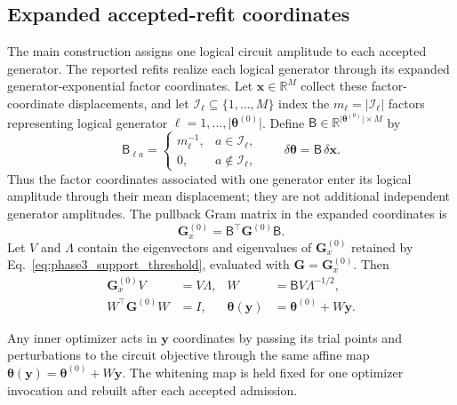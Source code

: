 \documentclass[
  reprint,
  amsmath,
  amssymb,
  aps,
  pra,
  nofootinbib,
  superscriptaddress,
  floatfix
]{revtex4-2}
\begin{document}
\subsection{Expanded accepted-refit coordinates}
\label{app:accepted_refit_details}

The main construction assigns one logical circuit amplitude to each accepted
generator. The reported refits realize each logical generator through its
expanded generator-exponential factor coordinates. Let
\(\mathbf x\in\mathbb R^M\) collect these factor-coordinate displacements, and
let \(\mathcal I_\ell\subseteq\{1,\ldots,M\}\) index the
\(m_\ell=|\mathcal I_\ell|\) factors representing logical generator
\(\ell=1,\ldots,\lvert\boldsymbol\theta^{(0)}\rvert\). Define
\(\mathsf B\in
\mathbb R^{\lvert\boldsymbol\theta^{(0)}\rvert\times M}\) by
\begin{equation}
\mathsf B_{\ell a}
=
\begin{cases}
m_\ell^{-1}, & a\in\mathcal I_\ell,\\
0, & a\notin\mathcal I_\ell,
\end{cases}
\qquad
\delta\boldsymbol\theta
=
\mathsf B\,\delta\mathbf x .
\label{eq:expanded_refit_block_map}
\end{equation}
Thus the factor coordinates associated with one generator enter its logical
amplitude through their mean displacement; they are not additional independent
generator amplitudes. The pullback Gram matrix in the expanded coordinates is
\begin{equation}
\mathbf G_x^{(0)}
=
\mathsf B^\top\mathbf G^{(0)}\mathsf B.
\label{eq:expanded_refit_gram}
\end{equation}
Let \(V\) and \(\Lambda\) contain the eigenvectors and eigenvalues of
\(\mathbf G_x^{(0)}\) retained by
Eq.~\eqref{eq:phase3_support_threshold}, evaluated with
\(\mathbf G=\mathbf G_x^{(0)}\). Then
\begin{equation}
\begin{aligned}
\mathbf G_x^{(0)}V&=V\Lambda,
&
W&=\mathsf B V\Lambda^{-1/2},\\
W^\top\mathbf G^{(0)}W&=I,
&
\boldsymbol\theta(\mathbf y)
&=\boldsymbol\theta^{(0)}+W\mathbf y.
\end{aligned}
\label{eq:expanded_refit_whitening}
\end{equation}

Any inner optimizer acts in \(\mathbf y\) coordinates by passing its trial
points and perturbations to the circuit objective through the same affine map
\(\boldsymbol\theta(\mathbf y)=\boldsymbol\theta^{(0)}+W\mathbf y\).
The whitening map is held fixed for one optimizer invocation and rebuilt after
each accepted admission.
\end{document}
